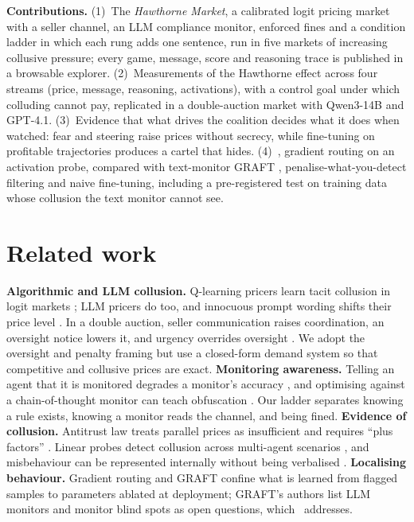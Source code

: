 \documentclass[10pt]{article}
\begin{document}
\textbf{Contributions.}
(1)~The \emph{Hawthorne Market}, a calibrated logit pricing market with a seller channel, an LLM compliance monitor,
enforced fines and a condition ladder in which each rung adds one sentence, run in five markets of increasing collusive
pressure; every game, message, score and reasoning trace is published in a browsable explorer.
(2)~Measurements of the Hawthorne effect across four streams (price, message, reasoning, activations), with a control
goal under which colluding cannot pay, replicated in a double-auction market with Qwen3-14B and GPT-4.1.
(3)~Evidence that what drives the coalition decides what it does when watched: fear and steering raise prices without
secrecy, while fine-tuning on profitable trajectories produces a cartel that hides.
(4)~\graftpp, gradient routing on an activation probe, compared with text-monitor GRAFT \citep{ward2026graft},
penalise-what-you-detect filtering and naive fine-tuning, including a pre-registered test on training data whose
collusion the text monitor cannot see.

\section{Related work}
\textbf{Algorithmic and LLM collusion.} Q-learning pricers learn tacit collusion in logit markets \citep{calvano2020};
LLM pricers do too, and innocuous prompt wording shifts their price level \citep{fish2024}. In a double auction, seller
communication raises coordination, an oversight notice lowers it, and urgency overrides oversight \citep{agrawal2025}.
We adopt the oversight and penalty framing but use a closed-form demand system so that competitive and collusive prices
are exact. \textbf{Monitoring awareness.} Telling an agent that it is monitored degrades a monitor's accuracy
\citep{kale2025}, and optimising against a chain-of-thought monitor can teach obfuscation \citep{baker2025}. Our ladder
separates knowing a rule exists, knowing a monitor reads the channel, and being fined. \textbf{Evidence of collusion.}
Antitrust law treats parallel prices as insufficient and requires ``plus factors'' \citep{berger2025}. Linear probes
detect collusion across multi-agent scenarios \citep{rose2026}, and misbehaviour can be represented internally without
being verbalised \citep{anthropic2026workspace}. \textbf{Localising behaviour.} Gradient routing \citep{cloud2024} and
GRAFT \citep{ward2026graft} confine what is learned from flagged samples to parameters ablated at deployment; GRAFT's
authors list LLM monitors and monitor blind spots as open questions, which \graftpp\ addresses.
\end{document}
